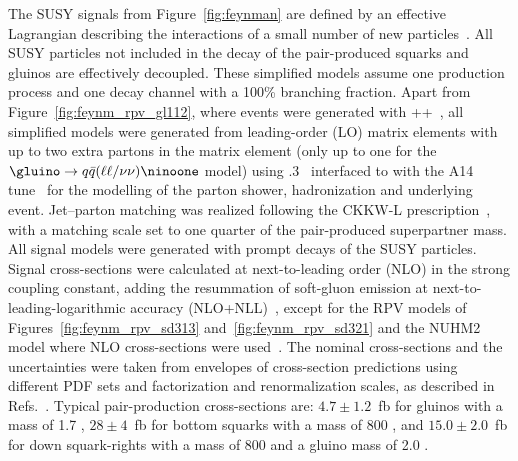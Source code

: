 The SUSY signals from Figure~\ref{fig:feynman} are defined by an effective Lagrangian describing the interactions of a small number of new 
particles~\cite{Alwall:2008ve,Alwall:2008ag,Alves:2011wf}. All SUSY particles not included 
in the decay of the pair-produced squarks and gluinos are effectively decoupled. These simplified models assume one 
production process and one decay channel with a 100\% branching fraction. Apart from Figure~\ref{fig:feynm_rpv_gl112}, where 
events were generated with \HERWIG++~\cite{Corcella:2000bw}, all simplified models were generated from leading-order (LO) matrix elements 
with up to two extra partons in the matrix element (only up to one for the $\gluino\to q\bar q(\ell\ell/\nu\nu)\ninoone$ model) 
using .3~\cite{Alwall:2014hca} interfaced to  with the A14 tune~\cite{ATL-PHYS-PUB-2014-021} for the 
modelling of the parton shower, hadronization and underlying event.
Jet--parton matching was realized following the CKKW-L prescription~\cite{Lonnblad:2011xx}, with a matching scale set to one quarter of 
the pair-produced superpartner mass. All signal models were generated 
with prompt decays of the SUSY particles. Signal cross-sections were calculated at next-to-leading order (NLO) in the strong coupling constant, 
adding the resummation of soft-gluon emission at next-to-leading-logarithmic 
accuracy (NLO+NLL)~\cite{Beenakker:1996ch,Kulesza:2008jb,Kulesza:2009kq,Beenakker:2009ha,Beenakker:2011fu}, except 
for the RPV models of Figures~\ref{fig:feynm_rpv_sd313} and~\ref{fig:feynm_rpv_sd321} and the NUHM2 model where NLO 
cross-sections were used~\cite{Beenakker:1996ed,Beenakker:1996ch}. The nominal cross-sections and the uncertainties were taken from 
envelopes of cross-section predictions using different PDF sets 
and factorization and renormalization scales, as described in Refs.~\cite{Kramer:2012bx,Borschensky:2014cia}. 
Typical pair-production cross-sections are: $4.7 \pm 1.2$~fb for gluinos with a mass of 1.7 \TeV, $28 \pm 4$~fb
for bottom squarks with a mass of 800 \GeV, and $15.0\pm 2.0$~fb for down 
squark-rights with a mass of 800 \GeV and a gluino mass of 2.0 \TeV.

